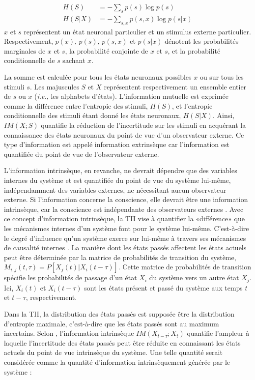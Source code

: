 \begin{align}
H(S) &= - \sum_s p(s) \log p(s) \\
H(S|X) &= - \sum_{s,x} p(s,x) \log p(s|x)
\end{align}
$x$ et $s$ représentent un état neuronal particulier et un stimulus externe particulier. 
Respectivement, $p(x)$, $p(s)$, $p(s,x)$ et $p(s|x)$ dénotent les probabilités marginales de $x$ et $s$, la probabilité conjointe de $x$ et $s$, et la probabilité conditionnelle de $s$ sachant $x$. 

La somme est calculée pour tous les états neuronaux possibles $x$ ou sur tous les stimuli $s$. 
Les majuscules $S$ et $X$ représentent respectivement un ensemble entier de $s$ ou $x$ (\textit{i.e.}, les alphabets d'états). 
L'information mutuelle est exprimée comme la différence entre l'entropie des stimuli, $H(S)$, et l'entropie conditionnelle des stimuli étant donné les états neuronaux, $H(S|X)$. 
Ainsi, $IM(X;S)$ quantifie la réduction de l'incertitude sur les stimuli en acquérant la connaissance des états neuronaux du point de vue d'un observateur externe. 
Ce type d'information est appelé information extrinsèque car l'information est quantifiée du point de vue de l’observateur externe. 

L'information intrinsèque, en revanche, ne devrait dépendre que des variables internes du système et est quantifiée du point de vue du système lui-même, indépendamment des variables externes, ne nécessitant aucun observateur externe. 
Si l'information concerne la conscience, elle devrait être une information intrinsèque, car la conscience est indépendante des observateurs externes \citep{oizumi2016measuring}. 
Avec ce concept d'information intrinsèque, la TII vise à quantifier la «différence» que les mécanismes internes d'un système font pour le système lui-même. 
C'est-à-dire le degré d'influence qu'un système exerce sur lui-même à travers ses mécanismes de causalité internes \citep{tononi2008consciousness}. 
La manière dont les états passés affectent les états actuels peut être déterminée par la matrice de probabilités de transition du système, $M_{i,j}(t,\tau) = P[X_j(t)|X_i(t-\tau)]$. 
Cette matrice de probabilités de transition spécifie les probabilités de passage d'un état $X_i$ du système vers un autre état $X_j$. 
Ici, $X_i(t)$ et $X_i(t-\tau)$ sont les états présent et passé du système aux temps $t$ et $t-\tau$, respectivement. 

Dans la TII, la distribution des états passés est supposée être la distribution d'entropie maximale, c'est-à-dire que les états passés sont au maximum incertains. 
Selon \cite{oizumi2016measuring}, l'information intrinsèque $IM(X_{t-\tau};X_t)$ quantifie l'ampleur à laquelle l’incertitude des états passés peut être réduite en connaissant les états actuels du point de vue intrinsèque du système. 
Une telle quantité serait considérée comme la quantité d'information intrinsèquement générée par le système :

